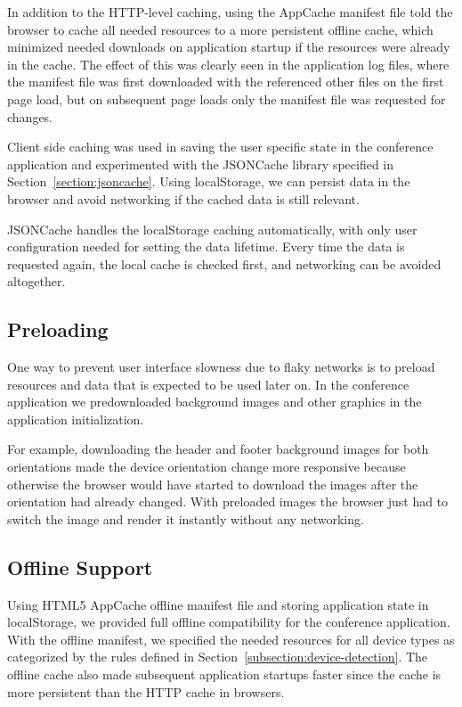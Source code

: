 In addition to the HTTP-level caching, using the AppCache manifest
file told the browser to cache all needed resources to a more
persistent offline cache, which minimized needed downloads on
application startup if the resources were already in the cache. The
effect of this was clearly seen in the application log files, where
the manifest file was first downloaded with the referenced other files
on the first page load, but on subsequent page loads only the manifest
file was requested for changes.

Client side caching was used in saving the user specific state in the
conference application and experimented with the JSONCache library
specified in Section~\ref{section:jsoncache}. Using localStorage, we
can persist data in the browser and avoid networking if the cached
data is still relevant.

JSONCache handles the localStorage caching automatically, with only
user configuration needed for setting the data lifetime. Every time
the data is requested again, the local cache is checked first, and
networking can be avoided altogether.

\subsection{Preloading}

One way to prevent user interface slowness due to flaky networks is to
preload resources and data that is expected to be used later on. In
the conference application we predownloaded background images and
other graphics in the application initialization.

For example, downloading the header and footer background images for
both orientations made the device orientation change more responsive
because otherwise the browser would have started to download the
images after the orientation had already changed. With preloaded
images the browser just had to switch the image and render it
instantly without any networking.

\subsection{Offline Support}

Using HTML5 AppCache offline manifest file and storing application
state in localStorage, we provided full offline compatibility for the
conference application. With the offline manifest, we specified the
needed resources for all device types as categorized by the rules
defined in Section~\ref{subsection:device-detection}. The offline
cache also made subsequent application startups faster since the cache
is more persistent than the HTTP cache in browsers.

